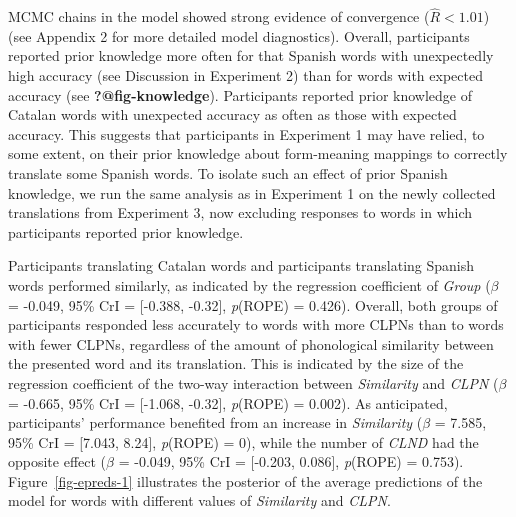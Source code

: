 \documentclass[
]{article}
\begin{document}
MCMC chains in the model showed strong evidence of convergence
(\(\hat{R}<1.01\)) (see Appendix 2 for more detailed model diagnostics).
Overall, participants reported prior knowledge more often for that
Spanish words with unexpectedly high accuracy (see Discussion in
Experiment 2) than for words with expected accuracy (see
\textbf{?@fig-knowledge}). Participants reported prior knowledge of
Catalan words with unexpected accuracy as often as those with expected
accuracy. This suggests that participants in Experiment 1 may have
relied, to some extent, on their prior knowledge about form-meaning
mappings to correctly translate some Spanish words. To isolate such an
effect of prior Spanish knowledge, we run the same analysis as in
Experiment 1 on the newly collected translations from Experiment 3, now
excluding responses to words in which participants reported prior
knowledge.

Participants translating Catalan words and participants translating
Spanish words performed similarly, as indicated by the regression
coefficient of \emph{Group} (\(\beta\) = -0.049, 95\% CrI = {[}-0.388,
-0.32{]}, \emph{p}(ROPE) = 0.426). Overall, both groups of participants
responded less accurately to words with more CLPNs than to words with
fewer CLPNs, regardless of the amount of phonological similarity between
the presented word and its translation. This is indicated by the size of
the regression coefficient of the two-way interaction between
\emph{Similarity} and \emph{CLPN} (\(\beta\) = -0.665, 95\% CrI =
{[}-1.068, -0.32{]}, \emph{p}(ROPE) = 0.002). As anticipated,
participants' performance benefited from an increase in
\emph{Similarity} (\(\beta\) = 7.585, 95\% CrI = {[}7.043, 8.24{]},
\emph{p}(ROPE) = 0), while the number of \emph{CLND} had the opposite
effect (\(\beta\) = -0.049, 95\% CrI = {[}-0.203, 0.086{]},
\emph{p}(ROPE) = 0.753). Figure~\ref{fig-epreds-1} illustrates the
posterior of the average predictions of the model for words with
different values of \emph{Similarity} and \emph{CLPN}.
\end{document}
